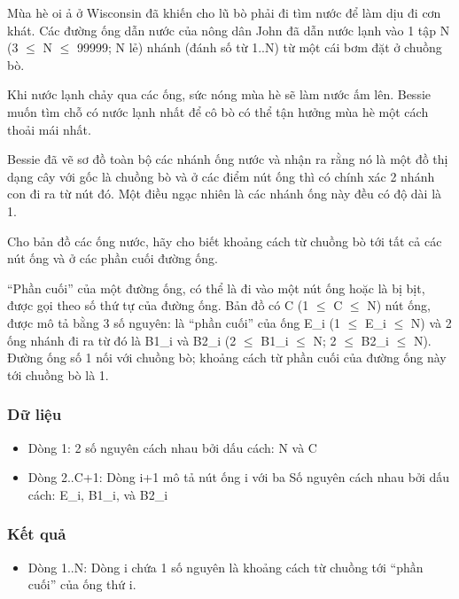



   Mùa hè oi ả ở Wisconsin đã khiến cho lũ bò phải đi tìm nước để làm dịu đi cơn khát. Các đường ống dẫn nước của nông dân John đã dẫn nước lạnh vào 1 tập N (3  $\le$  N  $\le$  99999; N lẻ) nhánh (đánh số từ 1..N) từ một cái bơm đặt ở chuồng bò.  

   Khi nước lạnh chảy qua các ống, sức nóng mùa hè sẽ làm nước ấm lên.  Bessie muốn tìm chỗ có nước lạnh nhất để cô bò có thể tận hưởng mùa  hè một cách thoải mái nhất.  

   Bessie đã vẽ sơ đồ toàn bộ các nhánh ống nước và nhận ra rằng nó là  một đồ thị dạng cây với gốc là chuồng bò và ở các điểm nút ống thì  có chính xác 2 nhánh con đi ra từ nút đó. Một điều ngạc nhiên là  các nhánh ống này đều có độ dài là 1.  

   Cho bản đồ các ống nước, hãy cho biết khoảng cách từ chuồng bò  tới tất cả các nút ống và ở các phần cuối đường ống.  

   “Phần cuối” của một đường ống, có thể là đi vào một nút ống hoặc  là bị bịt, được gọi theo số thứ tự của đường ống. Bản đồ có C  (1  $\le$  C  $\le$  N) nút ống, được mô tả bằng 3 số nguyên: là “phần cuối”  của ống E\_i (1  $\le$  E\_i  $\le$  N) và 2 ống nhánh đi ra từ đó là  B1\_i và B2\_i (2  $\le$  B1\_i  $\le$  N; 2  $\le$  B2\_i  $\le$  N). Đường ống số 1 nối  với chuồng bò; khoảng cách từ phần cuối của đường ống này  tới chuồng bò là 1.  

\subsubsection{   Dữ liệu  }
\begin{itemize}
	\item     Dòng 1: 2 số nguyên cách nhau bởi dấu cách: N và C   
	\item     Dòng 2..C+1: Dòng i+1 mô tả nút ống i với ba         Số nguyên cách nhau bởi dấu cách: E\_i, B1\_i, và B2\_i   
\end{itemize}

\subsubsection{   Kết quả  }
\begin{itemize}
	\item     Dòng 1..N: Dòng i chứa 1 số nguyên là khoảng            cách từ chuồng tới “phần cuối” của ống thứ i.   
\end{itemize}


